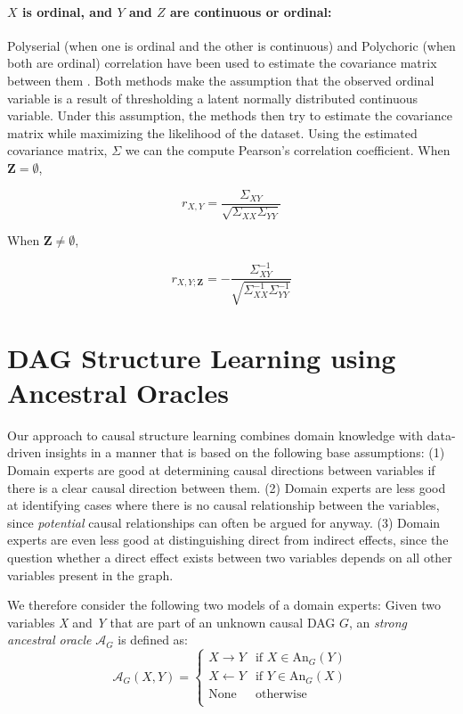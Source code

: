 \documentclass{uai2025} %
\begin{document}
\paragraph{$ X $ is ordinal, and $ Y $ and $ Z $  are continuous or ordinal: }

Polyserial (when one is ordinal and the other is continuous) and Polychoric
(when both are ordinal) correlation have been used to estimate the covariance
matrix between them \citep{Poon1987}. Both methods make the assumption that the
observed ordinal variable is a result of thresholding a latent normally
distributed continuous variable. Under this assumption, the methods then try to
estimate the covariance matrix while maximizing the likelihood of the dataset.
Using the estimated covariance matrix, $ \Sigma $ we can the compute Pearson's
correlation coefficient. When $ \bm{Z} = \emptyset $,

\begin{equation}
	r_{X, Y} = \frac{\Sigma_{XY}}{\sqrt{\Sigma_{XX} \Sigma_{YY}}}
\end{equation}

When $ \bm{Z} \neq \emptyset $, 

\begin{equation}
	r_{X, Y; \bm{Z}} = - \frac{\Sigma^{-1}_{XY}}{\sqrt{\Sigma^{-1}_{XX} \Sigma^{-1}_{YY}}}
\end{equation}


\section{DAG Structure Learning using Ancestral Oracles}
\label{sec:modification}

Our approach to causal structure learning combines domain knowledge with data-driven
insights in a manner that is based on the following base assumptions: 
(1) Domain experts are good at determining causal directions between variables if 
there is a clear causal direction between them. (2) Domain experts are less good
at identifying cases where there is no causal relationship between the variables,
since \emph{potential} causal relationships can often be argued for anyway.
(3) Domain experts are even less good at distinguishing direct from indirect 
effects, since the question whether a direct effect exists between two variables
depends on all other variables present in the graph. 

We therefore consider the following two models of a domain experts: Given two variables
\emph{X} and \emph{Y} that are part of an unknown causal DAG $G$, an \emph{strong ancestral oracle} 
$\mathcal{A}_G$ is defined as:
$$\mathcal{A}_G(X,Y)=\begin{cases}
 X \to Y & \textrm{if } X \in \textrm{An}_G(Y) \\
 X \gets Y & \textrm{if } Y \in \textrm{An}_G(X) \\
 \textrm{None} & \textrm{otherwise} \\
\end{cases}$$
\end{document}
